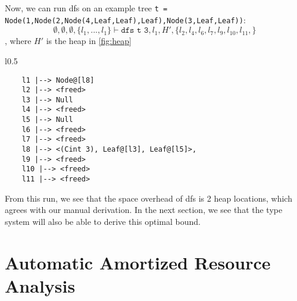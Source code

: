 \documentclass{easychair}
\theoremstyle{definition}
\begin{document}
Now, we can run dfs on an example tree 
\texttt{t = Node(1,Node(2,Node(4,Leaf,Leaf),Leaf),Node(3,Leaf,Leaf))}:
\[
\emptyset,\emptyset,\emptyset,\{l_1,...,l_1\} 
	\vdash \texttt{dfs t 3}, l_1, H', 
	\{l_2, l_4, l_6, l_7, l_9, l_10, l_11,\}
\], where $H'$ is the heap in \ref{fig:heap}

\begin{wrapfigure}{l}{0.5\textwidth}
	\vspace{-20pt}
		\begin{center}
\begin{verbatim}
	l1 |--> Node@[l8] 
	l2 |--> <freed>
	l3 |--> Null 
	l4 |--> <freed>
	l5 |--> Null
	l6 |--> <freed>
	l7 |--> <freed>
	l8 |--> <(Cint 3), Leaf@[l3], Leaf@[l5]>, 
	l9 |--> <freed>
	l10 |--> <freed>
	l11 |--> <freed>
\end{verbatim}
		\end{center}
				\vspace{-20pt}
			\caption{$H'$}
		\vspace{-10pt}
\label{fig:heap}
\end{wrapfigure}

From this run, we see that the space overhead of dfs is 2 heap locations, which agrees with 
our manual derivation. In the next section, we see that the type system will also be 
able to derive this optimal bound. 

\section{Automatic Amortized Resource Analysis}
\label{sect:aara}
\end{document}
